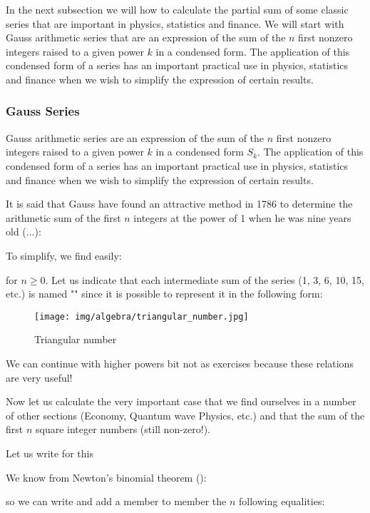 	In the next subsection we will how to calculate the partial sum of some classic series that are important in physics, statistics and finance. We will start with Gauss arithmetic series that are an expression of the sum of the $n$ first nonzero integers raised to a given power $k$ in a condensed form. The application of this condensed form of a series has an important practical use in physics, statistics and finance when we wish to simplify the expression of certain results.
	
	\subsubsection{Gauss Series}
	
	Gauss arithmetic series are an expression of the sum of the $n$ first nonzero integers raised to a given power $k$ in a condensed form $S_k$. The application of this condensed form of a series has an important practical use in physics, statistics and finance when we wish to simplify the expression of certain results.
	
	It is said that Gauss have found an attractive method in 1786 to determine the arithmetic sum of the first $n$ integers at the power of 1 when he was nine years old (...):
	
	To simplify, we find easily:
	
	for $n \geq 0$. Let us indicate that each intermediate sum of the series (1, 3, 6, 10, 15, etc.) is named "" since it is possible to represent it in the following form:

	\begin{figure}[H]
		\centering
		\texttt{[image: img/algebra/triangular\_number.jpg]}
		\caption{Triangular number}
	\end{figure}

	We can continue with higher powers bit not as exercises because these relations are very useful!

	Now let us calculate the very important case that we find ourselves in a number of other sections (Economy, Quantum wave Physics, etc.) and that  the sum of the first $n$ square integer numbers (still non-zero!).

	Let us write for this\label{sum of squares integers}
	
	We know from Newton's binomial theorem ():
	
	so we can write and add a member to member the $n$ following equalities:
	
